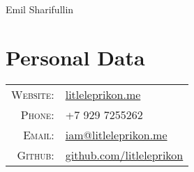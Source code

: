 \documentclass[a4paper,10pt]{article}
\begin{document}
\par{\centering
		{\Huge Emil Sharifullin
	}\bigskip\par}


\section{Personal Data}

\begin{tabular}{r p{11cm}}
    \textsc{Website:}   &  \href{https://litleleprikon.me/}{litleleprikon.me}\\
    \textsc{Phone:}     & +7 929 7255262\\
    \textsc{Email:}     &  \href{mailto:iam@litleleprikon.me}{iam@litleleprikon.me} \\
    \textsc{Github:}     &  \href{https://github.com/litleleprikon}{github.com/litleleprikon}
\end{tabular}

\end{document}
